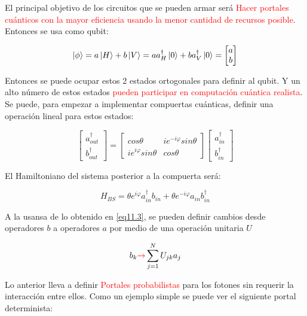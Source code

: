 \documentclass{book}
\begin{document}
El principal objetivo de los circuitos que se pueden armar será \textcolor{red}{Hacer portales cuánticos con la mayor eficiencia usando la menor cantidad de recursos posible}. Entonces se usa como qubit:

\begin{equation}\label{eq11.1}\ket{\phi}=a\ket{H}+b\ket{V}=a a_H^\dag\ket{0}+b a_V^\dag\ket{0}=\begin{bmatrix}a\\b\end{bmatrix}\end{equation}

Entonces se puede ocupar estos 2 estados ortogonales para definir al qubit. Y un alto número de estos estados \textcolor{red}{pueden participar en computación cuántica realista}. Se puede, para empezar a implementar compuertas cuánticas, definir una operación lineal para estos estados:

\begin{equation}\label{eq11.2}\begin{bmatrix}a^\dag_{out}\\b^\dag_{out}\end{bmatrix}=\begin{bmatrix}cos\theta&ie^{-i\varphi}sin\theta\\ie^{i\varphi}sin\theta&cos\theta\end{bmatrix}\begin{bmatrix}a^\dag_{in}\\b^\dag_{in}\end{bmatrix}\end{equation}

El Hamiltoniano del sistema posterior a la compuerta será:

\begin{equation}\label{eq11.3}H_{BS}=\theta e^{i\varphi}a^\dag_{in}b_{in}+\theta e^{-i\varphi}a_{in}b^\dag_{in}\end{equation}

A la usansa de lo obtenido en \ref{eq11.3}, se pueden definir cambios desde operadores $b$  a operadores $a$ por medio de una operación unitaria $U$

\begin{equation}\label{eq11.4}b_k\textcolor{red}{\rightarrow}\sum_{j=1}^N U_{jk}a_j\end{equation}

Lo anterior lleva a definir \textcolor{red}{Portales probabilistas} para los fotones sin requerir la interacción entre ellos. Como un ejemplo simple se puede ver el siguiente portal determinista:
\end{document}
